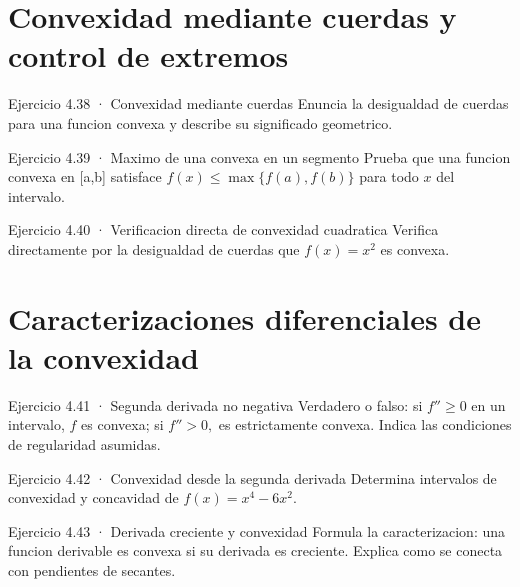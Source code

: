 \documentclass[10pt,a4paper,oneside,openany]{book}
\begin{document}
\section{Convexidad mediante cuerdas y control de extremos}
\begin{PSevenExerciseFixed}{Ejercicio 4.38 · Convexidad mediante cuerdas}
Enuncia la desigualdad de cuerdas para una funcion convexa y describe su significado geometrico.
\end{PSevenExerciseFixed}
\begin{PSevenExerciseFixed}{Ejercicio 4.39 · Maximo de una convexa en un segmento}
Prueba que una funcion convexa en [a,b] satisface \(f(x)\le \max\{f(a),f(b)\}\) para todo \(x\) del intervalo.
\end{PSevenExerciseFixed}
\begin{PSevenExerciseFixed}{Ejercicio 4.40 · Verificacion directa de convexidad cuadratica}
Verifica directamente por la desigualdad de cuerdas que \(f(x)=x^{2}\) es convexa.
\end{PSevenExerciseFixed}
\section{Caracterizaciones diferenciales de la convexidad}
\begin{PSevenExerciseFixed}{Ejercicio 4.41 · Segunda derivada no negativa}
Verdadero o falso: si \(f''\ge 0\) en un intervalo, \(f\) es convexa; si \(f''>0,\) es estrictamente convexa. Indica las condiciones de regularidad asumidas.
\end{PSevenExerciseFixed}
\begin{PSevenExerciseFixed}{Ejercicio 4.42 · Convexidad desde la segunda derivada}
Determina intervalos de convexidad y concavidad de \(f(x)=x^{4}-6x^{2}\).
\end{PSevenExerciseFixed}
\begin{PSevenExerciseFixed}{Ejercicio 4.43 · Derivada creciente y convexidad}
Formula la caracterizacion: una funcion derivable es convexa si su derivada es creciente. Explica como se conecta con pendientes de secantes.
\end{PSevenExerciseFixed}
\end{document}

